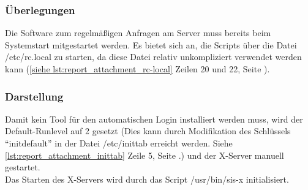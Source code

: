 \subsubsection{Überlegungen}

Die Software zum regelmäßigen Anfragen am Server muss bereits beim Systemstart mitgestartet werden. Es bietet sich an, die Scripts über die Datei /etc/rc.local zu starten, da diese Datei relativ unkompliziert verwendet werden kann (\autoref{siehe lst:report_attachment_rc-local} Zeilen 20 und 22, Seite \pageref{lst:report_attachment_rc-local}).\\

\subsubsection{Darstellung}

Damit kein Tool für den automatischen Login installiert werden muss, wird der Default-Runlevel auf 2 gesetzt (Dies kann durch Modifikation des Schlüssels \enquote{initdefault} in der Datei /etc/inittab erreicht werden. Siehe \autoref{lst:report_attachment_inittab} Zeile 5, Seite \pageref{lst:report_attachment_inittab}.) und der X-Server manuell gestartet.\\
Das Starten des X-Servers wird durch das Script /usr/bin/sis-x initialisiert.



